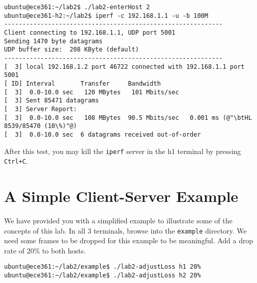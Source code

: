 \documentclass[11pt]{article}
\begin{document}
\begin{lstlisting}[style=ece361shell, caption={Running an \texttt{iperf} client in h2.}, label={lst:iperf-client}]
ubuntu@ece361:~/lab2$ ./lab2-enterHost 2
ubuntu@ece361-h2:~/lab2$ iperf -c 192.168.1.1 -u -b 100M
------------------------------------------------------------
Client connecting to 192.168.1.1, UDP port 5001
Sending 1470 byte datagrams
UDP buffer size:  208 KByte (default)
------------------------------------------------------------
[  3] local 192.168.1.2 port 46722 connected with 192.168.1.1 port 5001
[ ID] Interval       Transfer     Bandwidth
[  3]  0.0-10.0 sec   120 MBytes   101 Mbits/sec
[  3] Sent 85471 datagrams
[  3] Server Report:
[  3]  0.0-10.0 sec   108 MBytes  90.5 Mbits/sec   0.001 ms (@"\btHL 8539/85470 (10\%)"@)
[  3]  0.0-10.0 sec  6 datagrams received out-of-order
\end{lstlisting}

After this test, you may kill the \texttt{iperf} server in the h1 terminal by pressing \texttt{Ctrl+C}.


%
%

\section{A Simple Client-Server Example}
\label{sec:example}

We have provided you with a simplified example to illustrate some of the concepts of this lab.
In all 3 terminals, browse into the \texttt{example} directory. We need some frames to be dropped for this example to be meaningful. Add a drop rate of 20\% to both hosts.
\begin{lstlisting}[style=ece361shell, caption={}]
ubuntu@ece361:~/lab2/example$ ./lab2-adjustLoss h1 20%
ubuntu@ece361:~/lab2/example$ ./lab2-adjustLoss h2 20%
\end{lstlisting}
\end{document}
